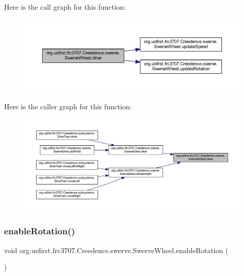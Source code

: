 Here is the call graph for this function\+:
\nopagebreak
\begin{figure}[H]
\begin{center}
\leavevmode
\includegraphics[width=350pt]{classorg_1_1usfirst_1_1frc3707_1_1_creedence_1_1swerve_1_1_swerve_wheel_aa65ea2f7221e642cd1d62992dc9b1e7b_cgraph}
\end{center}
\end{figure}
Here is the caller graph for this function\+:
\nopagebreak
\begin{figure}[H]
\begin{center}
\leavevmode
\includegraphics[width=350pt]{classorg_1_1usfirst_1_1frc3707_1_1_creedence_1_1swerve_1_1_swerve_wheel_aa65ea2f7221e642cd1d62992dc9b1e7b_icgraph}
\end{center}
\end{figure}
\mbox{\label{classorg_1_1usfirst_1_1frc3707_1_1_creedence_1_1swerve_1_1_swerve_wheel_a68eeae5986d5e08830b04f104ad02e3a}} 
\subsubsection{\texorpdfstring{enableRotation()}{enableRotation()}}
{\footnotesize\ttfamily void org.\+usfirst.\+frc3707.\+Creedence.\+swerve.\+Swerve\+Wheel.\+enable\+Rotation (\begin{DoxyParamCaption}{ }\end{DoxyParamCaption})}



